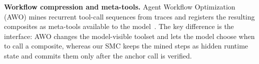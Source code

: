 \textbf{Workflow compression and meta-tools.}
Agent Workflow Optimization (AWO) mines recurrent tool-call sequences from traces and registers the resulting composites as meta-tools available to the model~\citep{awo-metatools-2026}. 
The key difference is the interface: AWO changes the model-visible toolset and lets the model choose when to call a composite, whereas our SMC keeps the mined steps as hidden runtime state and commits them only after the anchor call is verified.

